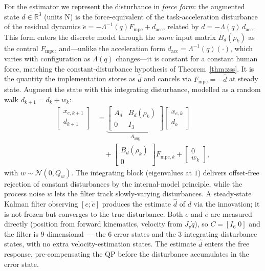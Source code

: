 \documentclass[journal]{IEEEtran}
\newcommand{\Laminv}{\Lambda^{-1}(q)}
\newcommand{\Fmpc}{F_{\text{mpc}}}
\newcommand{\Fmpck}[1]{F_{\text{mpc},#1}}
\newcommand{\dhat}{\hat{d}}
\begin{document}
For the estimator we represent the disturbance in \emph{force form}: the
augmented state $d\in\mathbb{R}^3$ (units N) is the force-equivalent of the
task-acceleration disturbance of the residual dynamics
$\ddot{e}=-\Laminv\Fmpc+d_{\text{acc}}$, related by $d=-\Lambda(q)\,d_{\text{acc}}$.
This form enters the discrete model through the \emph{same} input matrix
$B_d(\rho_k)$ as the control $\Fmpc$, and---unlike the acceleration form
$d_{\text{acc}}=\Lambda^{-1}(q)(\cdot)$, which varies with configuration as
$\Lambda(q)$ changes---it is constant for a constant human force, matching the
constant-disturbance hypothesis of Theorem~\ref{thm:zss}. It is the quantity
the implementation stores as $\dhat$ and cancels via $\Fmpc=-\dhat$ at steady
state. Augment the state with this integrating disturbance, modelled as a
random walk $d_{k+1}=d_k+w_k$:
\begin{equation}\label{eq:augstate}
\begin{aligned}
  \begin{bmatrix}x_{e,k+1}\\d_{k+1}\end{bmatrix}
  &= \underbrace{\begin{bmatrix}A_d&B_d(\rho_k)\\0&I_3\end{bmatrix}}_{A_{\text{aug}}}
    \begin{bmatrix}x_{e,k}\\d_k\end{bmatrix}\\[2pt]
  &\quad + \begin{bmatrix}B_d(\rho_k)\\0\end{bmatrix}\Fmpck{k}
  + \begin{bmatrix}0\\w_k\end{bmatrix},
\end{aligned}
\end{equation}
with $w\sim\mathcal{N}(0,Q_w)$.
The integrating block (eigenvalues at $1$) delivers offset-free
rejection of constant disturbances by the internal-model principle,
while the process noise $w$ lets the filter track slowly-varying
disturbances. A steady-state Kalman filter observing $[e;\dot{e}]$
produces the estimate $\dhat$ of $d$ via the innovation; it is not
frozen but converges to the true disturbance. Both $e$ and $\dot e$ are
measured directly (position from forward kinematics, velocity from
$J_v\dot q$), so $C=[I_6\;0]$ and the filter is $9$-dimensional --- the
$6$ error states and the $3$ integrating disturbance states, with no
extra velocity-estimation states. The estimate $\dhat$
enters the free response, pre-compensating the QP before the disturbance
accumulates in the error state.
\end{document}
